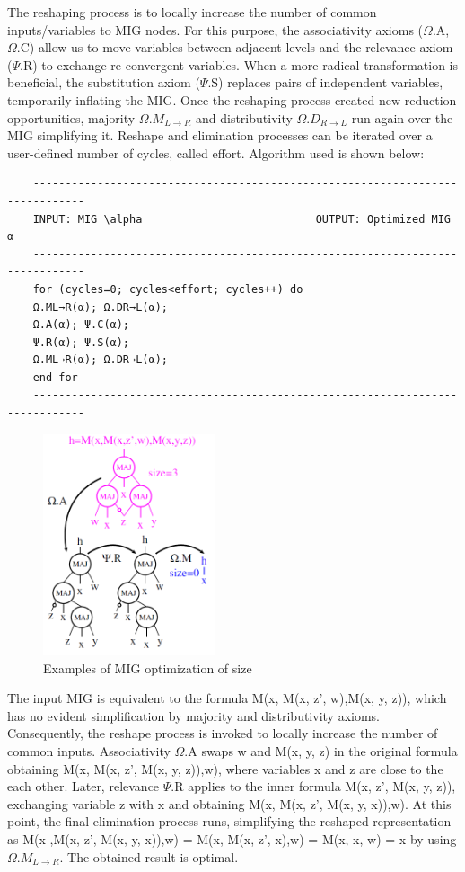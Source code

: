 \documentclass[
	accentcolor=1c,%
	type=intern,
	marginpar=false,
	ruledheaders=section,
	class=report,
	BCOR=5mm,
      parskip=half-,
	fontsize=10pt
	]{tudapub}
\begin{document}
	The reshaping process is to locally increase the number of common inputs/variables to MIG nodes. For this purpose, the associativity axioms ($\Omega$.A, $\Omega$.C) allow us to move variables between adjacent levels and the relevance axiom ($\Psi$.R) to exchange re-convergent variables. When a more radical transformation is beneficial, the substitution axiom ($\Psi$.S) replaces pairs of independent variables, temporarily inflating the MIG. Once the reshaping process created new reduction opportunities, majority $\Omega.M_{L\rightarrow R}$ and distributivity $\Omega.D_{R\rightarrow L}$ run again over the MIG simplifying it. Reshape and elimination processes can be iterated over a user-defined number of cycles, called effort.
	Algorithm used is shown below:\newline
	\begin{verbatim}
	------------------------------------------------------------------------------
	INPUT: MIG \alpha							OUTPUT: Optimized MIG α
	------------------------------------------------------------------------------
	for (cycles=0; cycles<effort; cycles++) do
	Ω.ML→R(α); Ω.DR→L(α);
	Ω.A(α); Ψ.C(α);
	Ψ.R(α); Ψ.S(α);
	Ω.ML→R(α); Ω.DR→L(α);
	end for
	------------------------------------------------------------------------------
	\end{verbatim}

	\begin{figure}
			\includegraphics [width=2in]{example_size.png}
			\caption{Examples of MIG optimization of size}
	\end{figure}
	The input MIG is equivalent to the formula M(x, M(x, z', w),M(x, y, z)), which has no evident simplification by majority and distributivity axioms. Consequently, the reshape process is invoked to locally increase the number of common inputs. Associativity $\Omega$.A swaps w and M(x, y, z) in the original formula obtaining M(x, M(x, z', M(x, y, z)),w), where variables x and z are close to the each other. Later, relevance $\Psi$.R applies to the inner formula M(x, z', M(x, y, z)), exchanging variable z with x and obtaining M(x, M(x, z', M(x, y, x)),w). At this point, the final elimination process runs, simplifying the reshaped representation as M(x ,M(x, z', M(x, y, x)),w) = M(x, M(x, z', x),w) = M(x, x, w) = x by using $\Omega.M_{L\rightarrow R}$. The obtained result is optimal.
\end{document}
